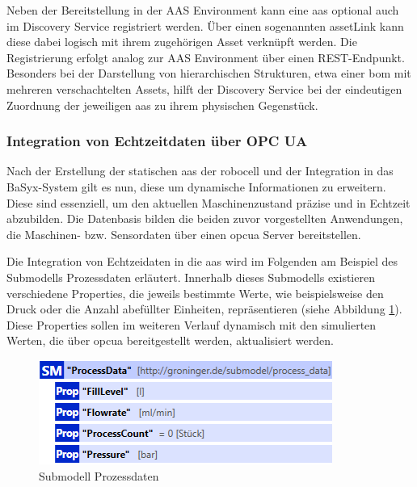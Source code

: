 

Neben der Bereitstellung in der AAS Environment kann eine \acs{aas} optional auch im Discovery Service registriert werden.
Über einen sogenannten assetLink kann diese dabei logisch mit ihrem zugehörigen Asset verknüpft werden.
Die Registrierung erfolgt analog zur AAS Environment über einen REST-Endpunkt.
Besonders bei der Darstellung von hierarchischen Strukturen, etwa einer \acs{bom} mit mehreren verschachtelten Assets, hilft der Discovery Service bei der eindeutigen Zuordnung der jeweiligen \acs{aas} zu ihrem physischen Gegenstück.

\subsubsection{Integration von Echtzeitdaten über OPC UA}
Nach der Erstellung der statischen \acs{aas} der robocell und der Integration in das BaSyx-System gilt es nun, diese um dynamische Informationen zu erweitern.
Diese sind essenziell, um den aktuellen Maschinenzustand präzise und in Echtzeit abzubilden.
Die Datenbasis bilden die beiden zuvor vorgestellten Anwendungen, die Maschinen- bzw. Sensordaten über einen \acs{opcua} Server bereitstellen.

Die Integration von Echtzeidaten in die \acs{aas} wird im Folgenden am Beispiel des Submodells Prozessdaten erläutert.
Innerhalb dieses Submodells existieren verschiedene Properties, die jeweils bestimmte Werte, wie beispielsweise den Druck oder die Anzahl abefüllter Einheiten, repräsentieren (siehe Abbildung \ref{fig:SubmodellProzessdaten}). %
Diese Properties sollen im weiteren Verlauf dynamisch mit den simulierten Werten, die über \acs{opcua} bereitgestellt werden, aktualisiert werden.

\begin{figure}[htbp]
    \centering
    \includegraphics{Bilder/OPCUA/ProcessDataPackageExplorer.PNG}
    \caption{Submodell Prozessdaten}
    \label{fig:SubmodellProzessdaten}
\end{figure}

